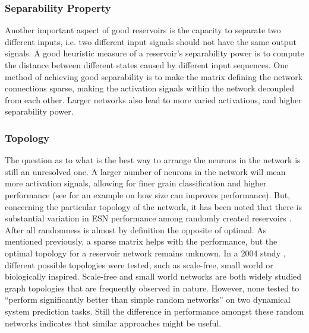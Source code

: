 \documentclass[12pt,oneside]{CUNY_CS_PhD}
\begin{document}
\subsubsection{Separability Property}
Another important aspect of good reservoirs is the capacity to separate two different inputs, i.e. two different input signals should not have the same output signals. A good heuristic measure of a reservoir's separability power is to compute the distance between different states caused by different input sequences. One method of achieving good separability is to make the matrix defining the network connections sparse, making the activation signals within the network decoupled from each other. Larger networks also lead to more varied activations, and higher separability power.

\subsubsection{Topology}
\label{topo}
The question as to what is the best way to arrange the neurons in the network is still an unresolved one. A larger number of neurons in the network will mean more activation signals, allowing for finer grain classification and higher performance (see \cite{triefenbach_phoneme_2010} for an example on how size can improves performance). But, concerning the particular topology of the network, it has been noted that there is substantial variation in ESN performance among randomly created reservoirs \cite{jiang2008supervised}. After all randomness is almost by definition the opposite of optimal. As mentioned previously, a sparse matrix helps with the performance, but the optimal topology for a reservoir network remains unknown. In a 2004 study \cite{Liebald2004}, different possible topologies were tested, such as scale-free, small world or biologically inspired. Scale-free and small world networks are both widely studied graph topologies that are frequently observed in nature. However, none tested to ``perform significantly better than simple random networks'' on two dynamical system prediction tasks. Still the difference in performance amongst these random networks indicates that similar approaches might be useful.
\end{document}
